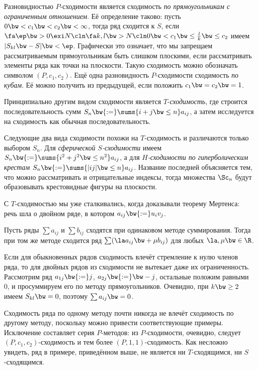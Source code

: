 \documentclass[a4paper]{article}
\begin{document}
Разновидностью $P$-сходимости является сходимость \emph{по прямоугольникам с ограниченным
отношением}. Её определение таково: пусть $0 \bw< c_1 \bw< c_2 \bw< \infty$, тогда ряд сходится к
$S$, если $\fa \ep \bw> 0 \exi N\cln \fa k, l\bw> N\cln 0 \bw< c_1 \bw\le \frac{l}{k} \bw\le c_2$
имеем $|S_{kl} \bw- S| \bw< \ep$. Графически это означает, что мы запрещаем рассматриваемым
прямоугольникам быть слишком плоскими, если рассматривать элементы ряда как точки на плоскости.
Такую сходимость можно обозначать символом $(P, c_1,c_2)$. Ещё одна разновидность $P$-сходимости\т
сходимость \emph{по кубам}. Её можно получить из предыдущей, если положить $c_1 \bw= c_2 \bw= 1$.

Принципиально другим видом сходимости является $T$-\emph{сходимость}, где строится
последовательность сумм $S_n \bw{:=} \sums{i+j \bw\le n} a_{ij}$, а затем исследуется на сходимость
как обычная последовательность.

Следующие два вида сходимости похожи на $T$-сходимость и различаются только выбором $S_n$. Для
\emph{сферической $S$-сходимости} имеем $S_n \bw{:=} \sums{i^2+j^2 \bw\le n^2} a_{ij}$, а для
\emph{$H$-сходимости по гиперболическим крестам} $S_n \bw{:=} \sums{|ij| \bw\le n} a_{ij}$.
Название последней объясняется тем, что можно рассматривать и отрицательные индексы, тогда
множества $\Sc_n$ будут образовывать крестовидные фигуры на плоскости.

\begin{note}
С $T$-сходимостью мы уже сталкивались, когда доказывали теорему Мертенса: речь шла о двойном ряде,
в котором $a_{ij} \bw{:=} u_iv_j$.
\end{note}

\begin{theorem}
Пусть ряды $\sum a_{ij}$ и $\sum b_{ij}$ сходятся при одинаковом методе суммирования. Тогда при том же методе
сходится ряд $\sum (\la a_{ij} \bw+ \mu b_{ij})$ для любых $\la, \mu \bw\in \R$.
\end{theorem}

\begin{ex}
Если для обыкновенных рядов сходимость влечёт стремление к нулю членов ряда, то для двойных рядов
из сходимости не вытекает даже их ограниченность. Рассмотрим ряд $a_{1j} \bw{:=} j$, $a_{2j}
\bw{:=} \bw-j$, остальные положим равными 0, и просуммируем его по методу прямоугольников. Очевидно,
при $k \bw\ge 2$ имеем $S_{kl} \bw= 0$, поэтому $\sum a_{ij} \bw= 0$.
\end{ex}

\begin{note}
Сходимость ряда по одному методу почти никогда не влечёт сходимость по другому методу, поскольку
можно привести соответствующие примеры. Исключение составляет серия $P$-методов: из $P$-сходимости,
очевидно, следует $(P, c_1,c_2)$-сходимость и тем более $(P,1,1)$-сходимость. Как несложно увидеть,
ряд в примере, приведённом выше, не является ни $T$-сходящимся, ни $S$-сходящимся.
\end{note}
\end{document}
